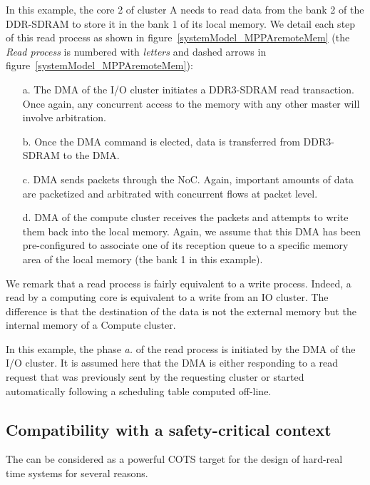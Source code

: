 \documentclass[main.tex]{subfiles}
\begin{document}
\begin{example}
    In this example, the core 2 of cluster A needs to read data from the bank 2 of the DDR-SDRAM to store it in the bank 1 of its local memory. We detail each step of this read process as shown in figure~\ref{systemModel_MPPAremoteMem} (the \emph{Read process} is numbered with \emph{letters} and dashed arrows in figure~\ref{systemModel_MPPAremoteMem}):

\begin{enumerate}
    \item[a.] The DMA of the I/O cluster initiates a DDR3-SDRAM read transaction. Once again, any concurrent access to the memory with any other master will involve arbitration.
    \item[b.] Once the DMA command is elected, data is transferred from DDR3-SDRAM to the DMA.
    \item[c.] DMA sends packets through the NoC. Again, important amounts of data are packetized and arbitrated with concurrent flows at packet level.
    \item[d.] DMA of the compute cluster receives the packets and attempts to write them back into the local memory. Again, we assume that this DMA has been pre-configured to associate one of its reception queue to a specific memory area of the local memory (the bank 1 in this example). 
\end{enumerate}

    We remark that a read process is fairly equivalent to a write process. Indeed, a read by a computing core is equivalent to a write from an IO cluster. The difference is that the destination of the data is not the external memory but the internal memory of a Compute cluster.

    In this example, the phase \emph{a.} of the read process is initiated by the DMA of the I/O cluster. It is assumed here that the DMA is either responding to a read request that was previously sent by the requesting cluster or started automatically following a scheduling table computed off-line.
\end{example}





\subsection{Compatibility with a safety-critical context}
The \mppalong can be considered as a powerful COTS target for the design of hard-real time systems for several reasons. 
\end{document}
